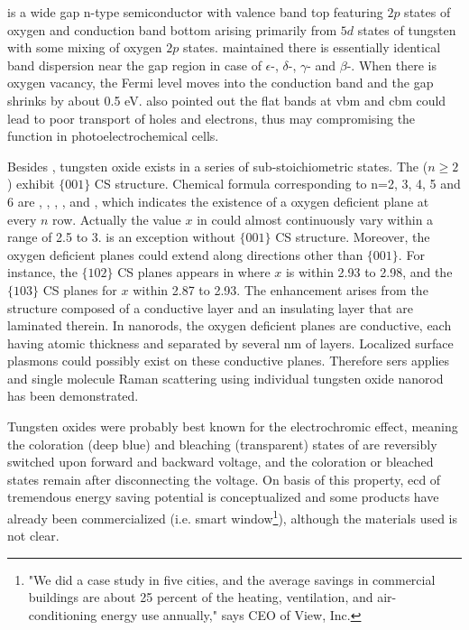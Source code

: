  is a wide gap n-type semiconductor with valence band top featuring $2p$ states of oxygen and conduction band bottom arising primarily from $5d$ states of tungsten with some mixing of oxygen $2p$ states.\cite{Gillet2004} \citeauthor{Migas2010a} maintained there is essentially identical band dispersion near the gap region in case of $\epsilon$-, $\delta$-, $\gamma$- and $\beta$-.\cite{Migas2010a} When there is oxygen vacancy, the Fermi level moves into the conduction band and the gap shrinks by about 0.5 eV. \citeauthor{Migas2010a} also pointed out the flat bands at \gls{vbm} and \gls{cbm} could lead to poor transport of holes and electrons, thus may compromising the function in photoelectrochemical cells.

Besides , tungsten oxide exists in a series of sub-stoichiometric states. The  ($n \geq 2$) exhibit $\{ 001 \}$ CS structure. Chemical formula corresponding to n=2, 3, 4, 5 and 6 are , , , , and , which indicates the existence of a oxygen deficient plane at every $n$ row. Actually the value $x$ in  could almost continuously vary within a range of 2.5 to 3.  is an exception without $\{ 001 \}$ CS structure. Moreover, the oxygen deficient planes could extend along directions other than $\{ 001 \}$. For instance, the $\{ 102 \}$ CS planes appears in  where $x$ is within 2.93 to 2.98, and  the $\{ 103 \}$ CS planes for $x$ within 2.87 to 2.93.\cite{Sloan1999} The enhancement arises from the structure composed of a conductive layer and an insulating layer that are laminated therein.\cite{Shingaya2013} In  nanorods, the oxygen deficient planes are conductive, each having atomic thickness and separated by several nm of  layers. Localized surface plasmons could possibly exist on these conductive planes. Therefore \gls{sers} applies and single molecule Raman scattering using individual tungsten oxide nanorod has been demonstrated.\cite{Shingaya2013}

Tungsten oxides were probably best known for the electrochromic effect, meaning the coloration (deep blue) and bleaching (transparent) states of  are reversibly switched upon forward and backward voltage, and the coloration or bleached states remain after disconnecting the voltage. On basis of this property, \gls{ecd} of tremendous energy saving potential is conceptualized and some products have already been commercialized (i.e. smart window\footnote{"We did a case study in five cities, and the average savings in commercial buildings are about 25 percent of the heating, ventilation, and air-conditioning energy use annually," says CEO of View, Inc.}), although the materials used is not clear. 

